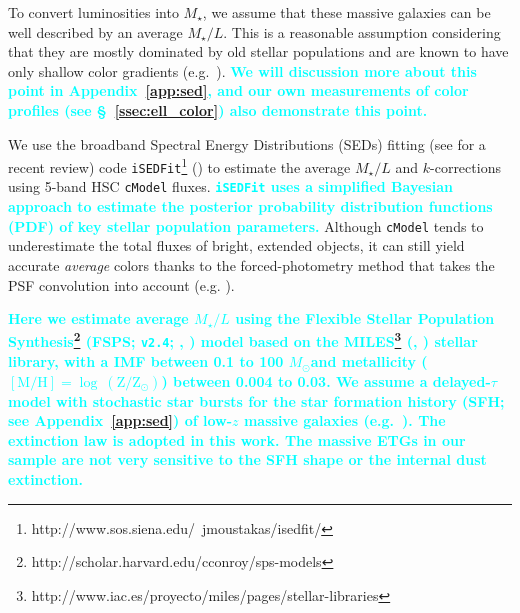 \documentclass[a4paper,fleqn,usenatbib]{mnras}
\def\msun{$M_\odot$}
\def\cmodel{\texttt{cModel}}
\def\mstar{{$M_{\star}$}}
\def\m2l{{$M_{\star}/L$}}
\newcommand{\song}[1]{\textcolor{cyan}{\textbf{#1}}}
\begin{document}
    To convert luminosities into \mstar{}, we assume that these massive galaxies 
    can be well described by an average \m2l{}. 
    This is a reasonable assumption considering that they are mostly dominated by 
    old stellar populations and are known to have only shallow color gradients
    (e.g.\ \citealt{Carollo1993, Davies1993, LaBarbera2012, DSouza2014}). 
    \song{
    We will discussion more about this point in Appendix~\ref{app:sed}, and our own 
    measurements of color profiles (see \S~\ref{ssec:ell_color}) also demonstrate 
    this point. 
    }
  
    We use the broadband Spectral Energy Distributions (SEDs) fitting 
    (see \citealt{Walcher2011} for a recent review) code 
    \texttt{iSEDFit}\footnote{http://www.sos.siena.edu/~jmoustakas/isedfit/} 
    (\citealt{Moustakas13}) to estimate the average \m2l{} and $k$-corrections using
    5-band HSC \cmodel{} fluxes.
    \song{
    \texttt{iSEDFit} uses a simplified Bayesian approach to estimate the 
    posterior probability distribution functions (PDF) of key stellar population
    parameters.
    }
    Although \cmodel{} tends to underestimate the total fluxes of bright, extended 
    objects, it can still yield accurate \emph{average} colors thanks to the 
    forced-photometry method that takes the PSF convolution into account
    (e.g. \citealt{SynPipe}). 
    
    \song{
    Here we estimate average \m2l{} using the Flexible Stellar Population 
    Synthesis\footnote{http://scholar.harvard.edu/cconroy/sps-models}
    (FSPS; \texttt{v2.4}; \citealt{FSPS}, \citealt{Conroy2010}) model based on the 
    MILES\footnote{http://www.iac.es/proyecto/miles/pages/stellar-libraries}
    (\citealt{MILES1}, \citealt{MILES2}) stellar library, with a
    \citet{Chabrier2003} IMF between 0.1 to 100 \msun and metallicity 
    ($[\mathrm{M}/\mathrm{H}]=\log\ (\mathrm{Z}/\mathrm{Z}_{\odot})$) between 
    0.004 to 0.03. 
    We assume a delayed-$\tau$ model with stochastic star bursts 
    for the star formation history (SFH; see Appendix~\ref{app:sed}) of low-$z$ 
    massive galaxies (e.g.\ \citealt{Kauffmann2003}). 
    The \citet{Calzetti2000} extinction law is adopted in this work.
    The massive ETGs in our sample are not very sensitive to the SFH shape or the 
    internal dust extinction. 
    }
    
\end{document}
